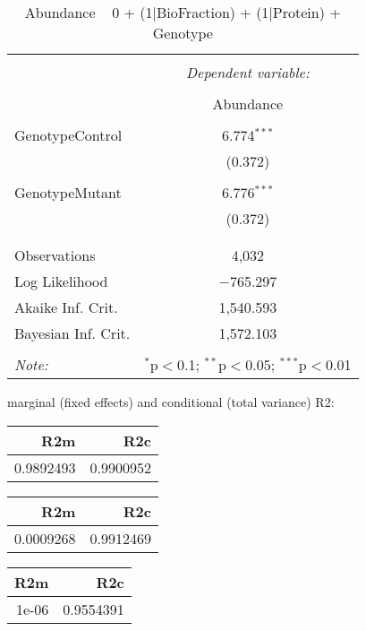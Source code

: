 \documentclass[11pt]{report}
\begin{document}
\begin{table}[!htbp] \centering 
  \caption{Abundance ~ 0 + (1|BioFraction) + (1|Protein) + Genotype} 
  \label{} 
\begin{tabular}{@{\extracolsep{5pt}}lc} 
\\[-1.8ex]\hline 
\hline \\[-1.8ex] 
 & \multicolumn{1}{c}{\textit{Dependent variable:}} \\ 
\cline{2-2} 
\\[-1.8ex] & Abundance \\ 
\hline \\[-1.8ex] 
 GenotypeControl & 6.774$^{***}$ \\ 
  & (0.372) \\ 
  & \\ 
 GenotypeMutant & 6.776$^{***}$ \\ 
  & (0.372) \\ 
  & \\ 
\hline \\[-1.8ex] 
Observations & 4,032 \\ 
Log Likelihood & $-$765.297 \\ 
Akaike Inf. Crit. & 1,540.593 \\ 
Bayesian Inf. Crit. & 1,572.103 \\ 
\hline 
\hline \\[-1.8ex] 
\textit{Note:}  & \multicolumn{1}{r}{$^{*}$p$<$0.1; $^{**}$p$<$0.05; $^{***}$p$<$0.01} \\ 
\end{tabular} 
\end{table} 
marginal (fixed effects) and conditional (total variance) R2:

\begin{tabular}{r|r}
\hline
R2m & R2c\\
\hline
0.9892493 & 0.9900952\\
\hline
\end{tabular}

\begin{tabular}{r|r}
\hline
R2m & R2c\\
\hline
0.0009268 & 0.9912469\\
\hline
\end{tabular}

\begin{tabular}{r|r}
\hline
R2m & R2c\\
\hline
1e-06 & 0.9554391\\
\hline
\end{tabular}
\end{document}
